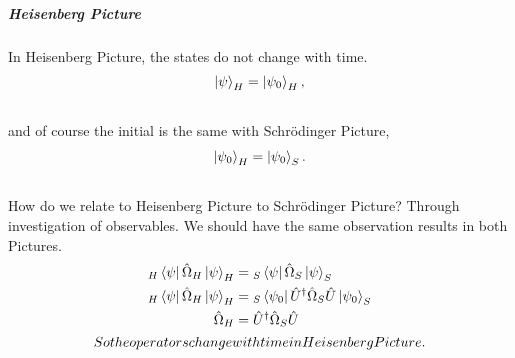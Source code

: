 \documentclass[letterpaper,10pt,english]{sphinxmanual}
\newcommand{\bra}[1]{\left\langle #1\right|}
\newcommand{\ket}[1]{\left| #1\right\rangle}
\begin{document}
\subparagraph{Heisenberg Picture}
\label{QuantumMechanics:heisenberg-picture}
In Heisenberg Picture, the states do not change with time.
\begin{gather}
\begin{split}\ket{\psi} _ H = \ket{\psi_0} _ H ,\end{split}\notag\\\begin{split}\end{split}\notag
\end{gather}
and of course the initial is the same with Schrödinger Picture,
\begin{gather}
\begin{split}\ket{\psi_0} _ H = \ket{\psi _ 0} _ S .\end{split}\notag\\\begin{split}\end{split}\notag
\end{gather}
How do we relate to Heisenberg Picture to Schrödinger Picture? Through investigation of observables. We should have the same observation results in both Pictures.
\begin{gather}
\begin{split}{} _ H \bra{\psi} \hat \Omega _ H \ket{\psi} _ H & =  {} _ S \bra{\psi} \hat \Omega _ S \ket{\psi} _ S \\
  {} _ H \bra{\psi} \hat \Omega _ H \ket{\psi} _ H & =  {} _ S \bra{\psi _ 0} \hat U^\dagger \hat \Omega _ S  \hat U \ket{\psi _ 0} _ S \\
  \hat \Omega _ H & =  \hat U^\dagger \hat \Omega _ S \hat U\end{split}\notag\\\begin{split}So the operators change with time in Heisenberg Picture.\end{split}\notag
\end{gather}
\end{document}
